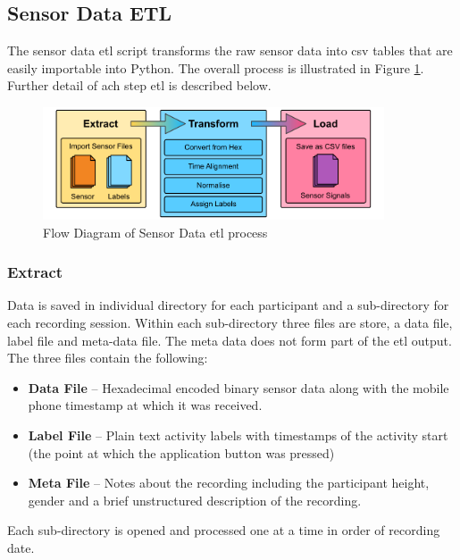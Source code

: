 \subsection{Sensor Data ETL}
\label{subsec:sensor-ETL}
The sensor data \acrshort{etl} script transforms the raw sensor data into \acrshort{csv} tables that are easily importable into Python. The overall process is illustrated in Figure \ref{fig:methods_sensor_ETL}. Further detail of ach step \acrshort{etl} is described below.

\begin{figure}[hbt]
    \centering
    \includegraphics[width=0.9\textwidth]{content/3-Methods/Sensor_ETL.pdf}
    \caption{Flow Diagram of Sensor Data \acrshort{etl} process}
    \label{fig:methods_sensor_ETL}
\end{figure}

\subsubsection{Extract} %
Data is saved in individual directory for each participant and a sub-directory for each recording session. Within each sub-directory three files are store, a data file, label file and meta-data file. The meta data does not form part of the \acrshort{etl} output. The three files contain the following:
\begin{itemize}
    \item \textbf{Data File} -- Hexadecimal encoded binary sensor data along with the mobile phone timestamp at which it was received.
    \item \textbf{Label File} -- Plain text activity labels with timestamps of the activity start (the point at which the application button was pressed)
    \item \textbf{Meta File} -- Notes about the recording including the participant height, gender and a brief unstructured description of the recording.
\end{itemize}

Each sub-directory is opened and processed one at a time in order of recording date.

